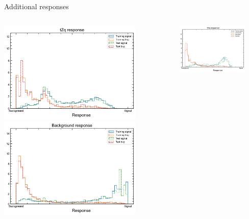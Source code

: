 \begin{frame}{Additional responses}
  \begin{columns}
    \begin{column}{0.5\textwidth}
      \includegraphics[width=0.8\textwidth]{resp1}
      \includegraphics[width=0.8\textwidth]{resp2}
    \end{column}
    \begin{column}{0.5\textwidth}
      \includegraphics[width=0.8\textwidth]{resp3}

\end{column}
\end{columns}
\end{frame}
